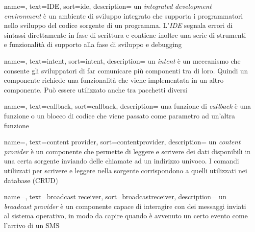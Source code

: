 {
	name=,
	text=IDE,
	sort=ide,
	description={ un \emph{integrated development environment} è un ambiente di sviluppo integrato che supporta i programmatori nello sviluppo del codice sorgente di un programma. L'\emph{IDE} segnala errori di sintassi direttamente in fase di scrittura e contiene inoltre una serie di strumenti e funzionalità di supporto alla fase di sviluppo e debugging }
}

{
	name=,
	text=intent,
	sort=intent,
	description={ un \emph{intent} è un meccanismo che consente gli sviluppatori di far comunicare più componenti tra di loro. Quindi un componente richiede una funzionalità che viene implementata in un altro componente. Può essere utilizzato anche tra pacchetti diversi   }
}

{
	name=,
	text=callback,
	sort=callback,
	description={ una funzione di \emph{callback} è una funzione o un blocco di codice che viene passato come parametro ad un'altra funzione  }
}

{
	name=,
	text=content provider,
	sort=contentprovider,
	description={ un \emph{content provider} è un componente che permette di leggere e scrivere dei dati disponibili in una certa sorgente inviando delle chiamate ad un indirizzo univoco. I comandi utilizzati per scrivere e leggere nella sorgente corrispondono a quelli utilizzati nei database (CRUD) }
}

{
	name=,
	text=broadcast receiver,
	sort=broadcastreceiver,
	description={ un \emph{broadcast provider} è un componente capace di interagire con dei messaggi inviati al sistema operativo, in modo da capire quando è avvenuto un certo evento come l'arrivo di un SMS }
}